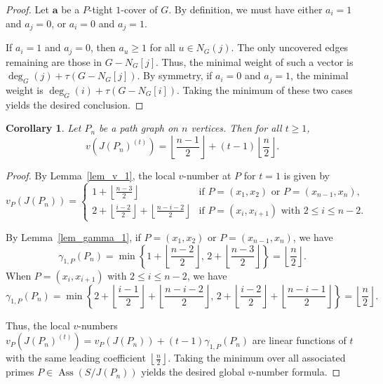 \documentclass[12pt,amscd]{amsart}
\newtheorem{cor}[thm]{Corollary}
\theoremstyle{definition}
\numberwithin{equation}{section}
\begin{document}
\begin{proof}
Let $\mathbf{a}$ be a $P$-tight $1$-cover of $G$. By definition, we must have either $a_i = 1$ and $a_j = 0$, or $a_i = 0$ and $a_j = 1$. 

If $a_i = 1$ and $a_j = 0$, then $a_u \ge 1$ for all $u \in N_G(j)$. The only uncovered edges remaining are those in $G - N_G[j]$. Thus, the minimal weight of such a vector is $\deg_G(j) + \tau(G - N_G[j])$. By symmetry, if $a_i = 0$ and $a_j = 1$, the minimal weight is $\deg_G(i) + \tau(G - N_G[i])$. Taking the minimum of these two cases yields the desired conclusion.
\end{proof}

\begin{cor}
Let $P_n$ be a path graph on $n$ vertices. Then for all $t \ge 1$,
\[
v(J(P_n)^{(t)}) = \left\lfloor \frac{n-1}{2} \right\rfloor + (t-1) \left\lfloor \frac{n}{2} \right\rfloor.
\]
\end{cor}

\begin{proof}
By Lemma~\ref{lem_v_1}, the local $v$-number at $P$ for $t = 1$ is given by
\[
v_P(J(P_n)) = \begin{cases}
1 + \left\lfloor \frac{n-3}{2} \right\rfloor & \text{if } P = (x_1, x_2) \text{ or } P = (x_{n-1}, x_n), \\[6pt]
2 + \left\lfloor \frac{i-2}{2} \right\rfloor + \left\lfloor \frac{n-i-2}{2} \right\rfloor & \text{if } P = (x_i, x_{i+1}) \text{ with } 2 \le i \le n-2.
\end{cases}
\]

By Lemma~\ref{lem_gamma_1}, if $P = (x_1, x_2)$ or $P = (x_{n-1}, x_n)$, we have
\[
\gamma_{1,P}(P_n) = \min \left\{ 1 + \left\lfloor \frac{n-2}{2} \right\rfloor, \, 2 + \left\lfloor \frac{n-3}{2} \right\rfloor \right\} = \left\lfloor \frac{n}{2} \right\rfloor.
\]
When $P = (x_i, x_{i+1})$ with $2 \le i \le n-2$, we have
\[
\gamma_{1,P}(P_n) = \min \left\{ 2 + \left\lfloor \frac{i-1}{2} \right\rfloor + \left\lfloor \frac{n-i-2}{2} \right\rfloor, \, 2 + \left\lfloor \frac{i-2}{2} \right\rfloor + \left\lfloor \frac{n-i-1}{2} \right\rfloor \right\} = \left\lfloor \frac{n}{2} \right\rfloor.
\]

Thus, the local $v$-numbers $v_P(J(P_n)^{(t)}) = v_P(J(P_n)) + (t-1)\gamma_{1,P}(P_n)$ are linear functions of $t$ with the same leading coefficient $\left\lfloor \frac{n}{2} \right\rfloor$. Taking the minimum over all associated primes $P \in \operatorname{Ass}(S/J(P_n))$ yields the desired global $v$-number formula.
\end{proof}
\end{document}
